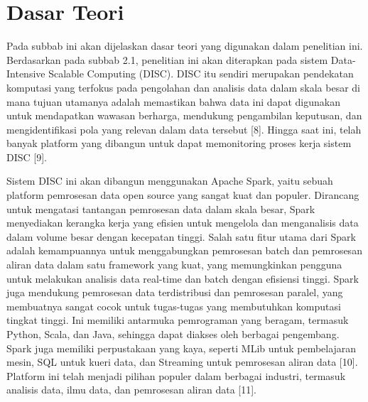 \section{Dasar Teori}
\label{sec:dasarTeori}

Pada subbab ini akan dijelaskan dasar teori yang digunakan dalam penelitian ini. Berdasarkan pada subbab 2.1, penelitian ini akan diterapkan pada sistem Data-Intensive Scalable Computing (DISC). DISC itu sendiri merupakan pendekatan komputasi yang terfokus pada pengolahan dan analisis data dalam skala besar di mana tujuan utamanya adalah memastikan bahwa data ini dapat digunakan untuk mendapatkan wawasan berharga, mendukung pengambilan keputusan, dan mengidentifikasi pola yang relevan dalam data tersebut [8]. Hingga saat ini, telah banyak platform yang dibangun untuk dapat memonitoring proses kerja sistem DISC [9].

Sistem DISC ini akan dibangun menggunakan Apache Spark, yaitu sebuah platform pemrosesan data open source yang sangat kuat dan populer. Dirancang untuk mengatasi tantangan pemrosesan data dalam skala besar, Spark menyediakan kerangka kerja yang efisien untuk mengelola dan menganalisis data dalam volume besar dengan kecepatan tinggi. Salah satu fitur utama dari Spark adalah kemampuannya untuk menggabungkan pemrosesan batch dan pemrosesan aliran data dalam satu framework yang kuat, yang memungkinkan pengguna untuk melakukan analisis data real-time dan batch dengan efisiensi tinggi. Spark juga mendukung pemrosesan data terdistribusi dan pemrosesan paralel, yang membuatnya sangat cocok untuk tugas-tugas yang membutuhkan komputasi tingkat tinggi. Ini memiliki antarmuka pemrograman yang beragam, termasuk Python, Scala, dan Java, sehingga dapat diakses oleh berbagai pengembang. Spark juga memiliki perpustakaan yang kaya, seperti MLib untuk pembelajaran mesin, SQL untuk kueri data, dan Streaming untuk pemrosesan aliran data [10]. Platform ini telah menjadi pilihan populer dalam berbagai industri, termasuk analisis data, ilmu data, dan pemrosesan aliran data [11]. 

